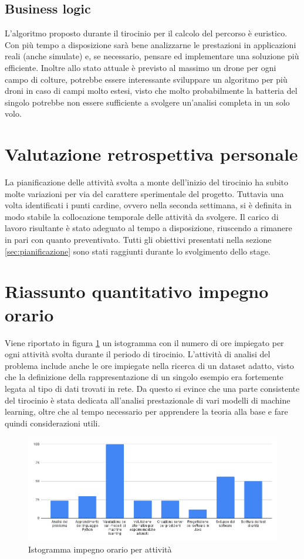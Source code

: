 \subsection{Business logic}
L'algoritmo proposto durante il tirocinio per il calcolo del percorso è euristico. Con più tempo a disposizione sarà bene analizzarne le prestazioni in applicazioni reali (anche simulate) e, se necessario, pensare ed implementare una soluzione più efficiente. Inoltre allo stato attuale è previsto al massimo un drone per ogni campo di colture, potrebbe essere interessante sviluppare un algoritmo per più droni in caso di campi molto estesi, visto che molto probabilmente la batteria del singolo potrebbe non essere sufficiente a svolgere un'analisi completa in un solo volo.

\section{Valutazione retrospettiva personale}
La pianificazione delle attività svolta a monte dell'inizio del tirocinio ha subito molte variazioni per via del carattere sperimentale del progetto. Tuttavia una volta identificati i punti cardine, ovvero nella seconda settimana, si è definita in modo stabile la collocazione temporale delle attività da svolgere. Il carico di lavoro risultante è stato adeguato al tempo a disposizione, riuscendo a rimanere in pari con quanto preventivato. Tutti gli obiettivi presentati nella sezione \ref{sec:pianificazione} sono stati raggiunti durante lo svolgimento dello stage.

\section{Riassunto quantitativo impegno orario}
Viene riportato in figura \ref{fig:impegno_orario} un istogramma con il numero di ore impiegato per ogni attività svolta durante il periodo di tirocinio. L'attività di analisi del problema include anche le ore impiegate nella ricerca di un dataset adatto, visto che la definizione della rappresentazione di un singolo esempio era fortemente legata al tipo di dati trovati in rete. Da questo si evince che una parte consistente del tirocinio è stata dedicata all'analisi prestazionale di vari modelli di machine learning, oltre che al tempo necessario per apprendere la teoria alla base e fare quindi considerazioni utili.

\begin{figure}
    \centering
    \includegraphics[width=\textwidth]{immagini/impegno_orario.png}
    \caption{Istogramma impegno orario per attività}
    \label{fig:impegno_orario}
\end{figure}

